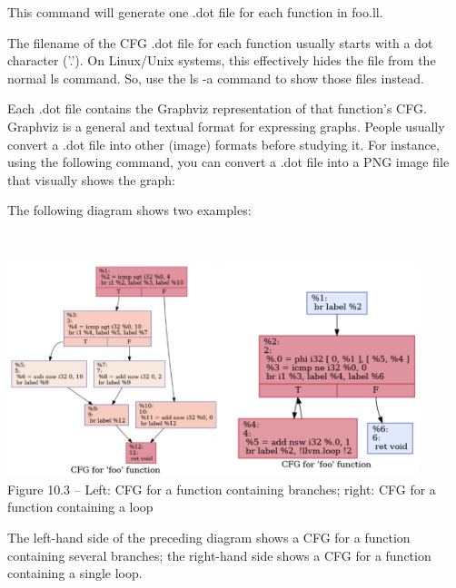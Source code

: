 This command will generate one .dot file for each function in foo.ll.

\begin{tcolorbox}[colback=blue!5!white,colframe=blue!75!black, fonttitle=\bfseries,title=The .dot File might be hidden]	
\hspace*{0.7cm}The filename of the CFG .dot file for each function usually starts with a dot character ('.'). On Linux/Unix systems, this effectively hides the file from the normal ls command. So, use the ls -a command to show those files instead.
\end{tcolorbox}

Each .dot file contains the Graphviz representation of that function's CFG. Graphviz is a general and textual format for expressing graphs. People usually convert a .dot file into other (image) formats before studying it. For instance, using the following command, you can convert a .dot file into a PNG image file that visually shows the graph:


The following diagram shows two examples:

\hspace*{\fill} \\ %
\begin{center}
\includegraphics[width=0.9\textwidth]{content/3/chapter10/images/3.png}\\
Figure 10.3 – Left: CFG for a function containing branches; right: CFG for a function containing a loop
\end{center}

The left-hand side of the preceding diagram shows a CFG for a function containing several branches; the right-hand side shows a CFG for a function containing a single loop.


